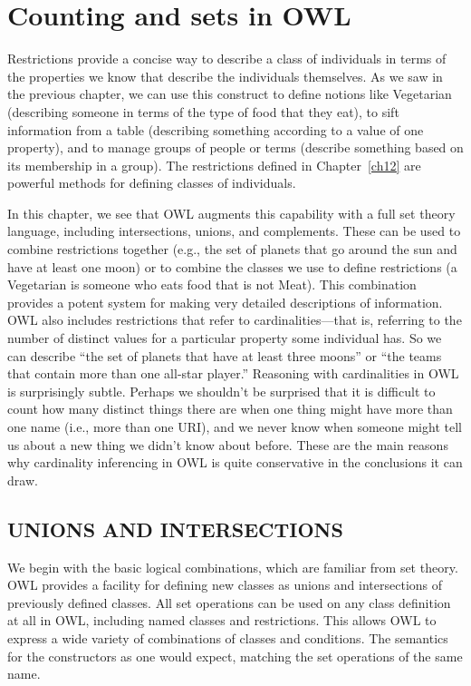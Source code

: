 \chapter{Counting and sets in OWL}
\label{ch13}

Restrictions provide a concise way to describe a class of individuals in
terms of the properties we know that describe the individuals
themselves. As we saw in the previous chapter, we can use this construct
to define notions like Vegetarian (describing someone in terms of the
type of food that they eat), to sift information from a table
(describing something according to a value of one property), and to
manage groups of people or terms (describe something based on its
membership in a group). The restrictions defined in Chapter~\ref{ch12} are
powerful methods for defining classes of individuals.

In this chapter, we see that OWL augments this capability with a full
set theory language, including intersections, unions, and complements.
These can be used to combine restrictions together (e.g., the set of
planets that go around the sun and have at least one moon) or to combine
the classes we use to define restrictions (a Vegetarian is someone who
eats food that is not Meat). This combination provides a potent system
for making very detailed descriptions of information.
OWL also includes restrictions that refer to cardinalities---that is,
referring to the number of distinct values for a particular property
some individual has. So we can describe ``the set of planets that have
at least three moons'' or ``the teams that contain more than one
all-star player.'' Reasoning with cardinalities in OWL is surprisingly
subtle. Perhaps we shouldn't be surprised that it is difficult to count
how many distinct things there are when one thing might have more than
one name (i.e., more than one URI), and we never know when someone might
tell us about a new thing we didn't know about before. These are the
main reasons why cardinality inferencing in OWL is quite conservative in
the conclusions it can draw.

\section{UNIONS AND INTERSECTIONS}
\label{unions}

We begin with the basic logical combinations, which are familiar from
set theory. OWL provides a facility for defining new classes as unions
and intersections of previously defined classes. All set operations can
be used on any class definition at all in OWL, including named classes
and restrictions. This allows OWL to express a wide variety of
combinations of classes and conditions. The semantics for the
constructors as one would expect, matching the set operations of the
same name.

